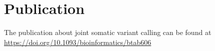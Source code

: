 \section{Publication}
The publication about joint somatic variant calling can be found at \\ \href{https://doi.org/10.1093/bioinformatics/btab606}{https://doi.org/10.1093/bioinformatics/btab606}